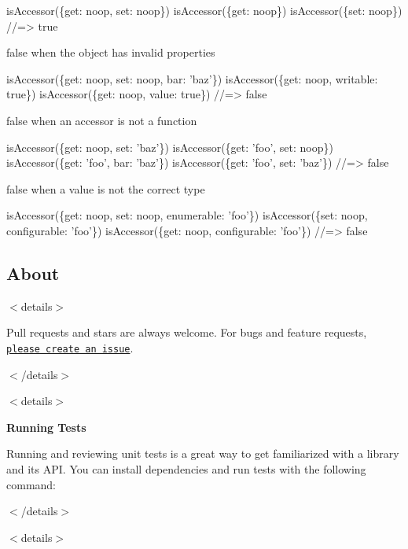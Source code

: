 \begin{DoxyCode}
isAccessor(\{get: noop, set: noop\})
isAccessor(\{get: noop\})
isAccessor(\{set: noop\})
//=> true
\end{DoxyCode}


{\ttfamily false} when the object has invalid properties


\begin{DoxyCode}
isAccessor(\{get: noop, set: noop, bar: 'baz'\})
isAccessor(\{get: noop, writable: true\})
isAccessor(\{get: noop, value: true\})
//=> false
\end{DoxyCode}


{\ttfamily false} when an accessor is not a function


\begin{DoxyCode}
isAccessor(\{get: noop, set: 'baz'\})
isAccessor(\{get: 'foo', set: noop\})
isAccessor(\{get: 'foo', bar: 'baz'\})
isAccessor(\{get: 'foo', set: 'baz'\})
//=> false
\end{DoxyCode}


{\ttfamily false} when a value is not the correct type


\begin{DoxyCode}
isAccessor(\{get: noop, set: noop, enumerable: 'foo'\})
isAccessor(\{set: noop, configurable: 'foo'\})
isAccessor(\{get: noop, configurable: 'foo'\})
//=> false
\end{DoxyCode}


\subsection*{About}

$<$details$>$

Pull requests and stars are always welcome. For bugs and feature requests, \href{../../issues/new}{\tt please create an issue}.

$<$/details$>$

$<$details$>$ 

{\bfseries Running Tests}

Running and reviewing unit tests is a great way to get familiarized with a library and its A\+PI. You can install dependencies and run tests with the following command\+:




$<$/details$>$

$<$details$>$ 

